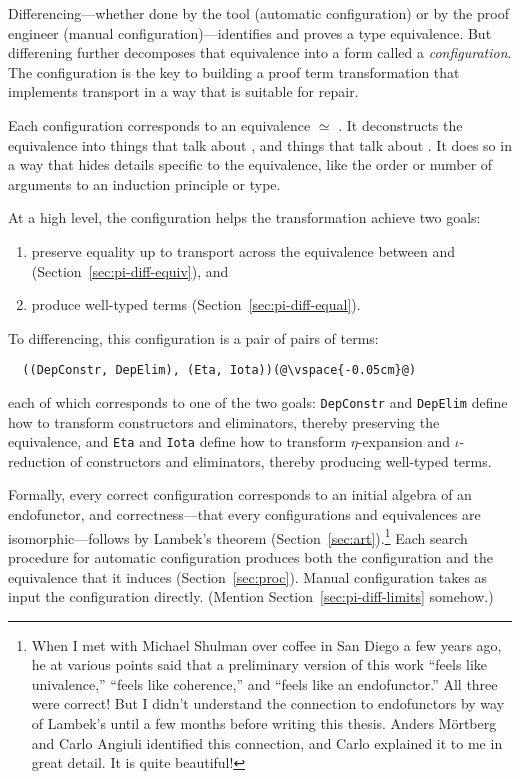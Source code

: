 Differencing---whether done by the tool (automatic configuration) or by the proof engineer (manual configuration)---identifies 
and proves a type equivalence. But differening further decomposes that equivalence into a form called a \textit{configuration}. 
The configuration is the key to building a proof term transformation that implements transport in a way that is suitable for repair.

Each configuration corresponds to an equivalence \Aa $\simeq$ \B.
It deconstructs the equivalence into things that talk about \Aa, and things that talk about \B.
It does so in a way that hides details
specific to the equivalence, like the order or number of arguments to an induction principle or type.

At a high level, the configuration helps the transformation achieve two goals: 

\begin{enumerate}
\item preserve equality up to transport across the equivalence between \Aa and \B (Section~\ref{sec:pi-diff-equiv}), and 
\item produce well-typed terms (Section~\ref{sec:pi-diff-equal}).
\end{enumerate}
To differencing, this configuration is a pair of pairs of terms:

\begin{lstlisting}
  ((DepConstr, DepElim), (Eta, Iota))(@\vspace{-0.05cm}@)
\end{lstlisting}
each of which corresponds to one of the two goals:
\lstinline{DepConstr} and \lstinline{DepElim} define how to transform constructors and eliminators, thereby preserving the equivalence, and 
\lstinline{Eta} and \lstinline{Iota} define how to transform $\eta$-expansion and $\iota$-reduction of constructors and eliminators, thereby producing well-typed terms.

Formally, every correct configuration corresponds to an initial algebra of an endofunctor,
and correctness---that every configurations and equivalences are isomorphic---follows by Lambek's theorem (Section~\ref{sec:art}).\footnote{When I met with Michael Shulman over coffee in San Diego a few years ago, he at various points said that a preliminary version of this work ``feels like univalence,'' ``feels like coherence,'' and ``feels like an endofunctor.'' All three were correct! But I didn't understand the connection to endofunctors by way of Lambek's until a few months before writing this thesis.
Anders M\"{o}rtberg and Carlo Angiuli identified this connection, and Carlo explained it to me in great detail.
It is quite beautiful!}  %
Each search procedure for automatic configuration produces both the configuration and the equivalence that it induces (Section~\ref{sec:proc}).
Manual configuration takes as input the configuration directly.
(Mention Section~\ref{sec:pi-diff-limits} somehow.)

